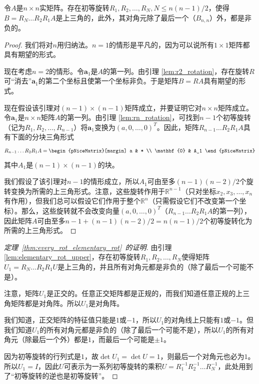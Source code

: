 \begin{lemma}\label{lem:elementary_rot_upper}
    令$A$是$n\times n$实矩阵。存在初等旋转$R_1,R_2,\dots,R_N,N\le n(n-1)/2$，使得$B=R_N\dots R_2R_1A$是上三角的，此外，其对角元除了最后一个（$B_{n,n}$）外，都是非负的。
\end{lemma}

\begin{proof}
    我们将对$n$用归纳法。$n=1$的情形是平凡的，因为可以说所有$1\times 1$矩阵都具有期望的形式。

    现在考虑$n=2$的情形。令$\mathbf{a}_1$是$A$的第一列。由引理 \ref{lem:r2_rotation}，存在旋转$R$可“消去”$\mathbf{a}_1$的第二个坐标且使第一个坐标非负。于是矩阵$B=RA$具有期望的形式。

    现在假设该引理对$(n-1)\times (n-1)$矩阵成立，并要证明它对$n\times n$矩阵成立。令$\mathbf{a}_1$是$n\times n$矩阵$A$的第一列。由引理 \ref{lem:rn_rotation}，可找到$n-1$个初等旋转（记为$R_1,R_2,\dots,R_{n-1}$）将$\mathbf{a}_1$变换为$(a,0,\dots,0)^T$。因此，矩阵$R_{n-1}\dots R_2R_1A$具有下面的分块三角形式
    \[R_{n-1}\dots R_2R_1A=\begin{pNiceMatrix}[margin]
        a & * \\ \mathbf{0} & A_1
    \end{pNiceMatrix}\]
    其中$A_1$是$(n-1)\times (n-1)$的块。

    我们假设了该引理对$n-1$的情形成立，所以$A_1$可由至多$(n-1)(n-2)/2$个旋转变换为所需的上三角形式。注意，这些旋转作用于$\mathbb{R}^{n-1}$（只对坐标$x_2,x_3,\dots,x_n$有作用），但我们总可以假设它们作用于整个$\mathbb{R}^{n}$（只需假设它们不改变第一个坐标）。那么，这些旋转就不会改变向量$(a,0,\dots,0)^T$（$R_{n-1}\dots R_2R_1A$的第一列），因此矩阵$A$可由至多$n-1+(n-1)(n-2)/2=n(n-1)/2$个初等旋转化为所需的上三角形式。
\end{proof}

\begin{proof}[定理~\ref{thm:every_rot_elementary_rot}~的证明]
    由引理 \ref{lem:elementary_rot_upper}，存在初等旋转$R_1,R_2,\dots,R_N$使得矩阵$U_1=R_N\dots R_2R_1U$是上三角的，并且所有对角元都是非负的（除了最后一个可能不是）。

    注意，矩阵$U_1$是正交的。任意正交矩阵都是正规的，而我们知道任意正规的上三角矩阵都是对角阵。所以$U_1$是对角阵。

    我们知道，正交矩阵的特征值只能是$1$或$-1$，所以$U_1$的对角线上只能有$1$或$-1$。但我们知道$U_1$的所有对角元都是非负的（除了最后一个可能不是），所以$U_1$的所有对角元（除最后一个外）都是$1$，而最后一个可能是$\pm 1$。

    因为初等旋转的行列式是$1$，故$\det U_1=\det U=1$，则最后一个对角元也必为$1$。所以$U_1=I$，因此$U$可表示为一系列初等旋转的乘积$U=R_1^{-1}R_2^{-1}\dots R_N^{-1}$，此处用到了“初等旋转的逆也是初等旋转”。
\end{proof}

